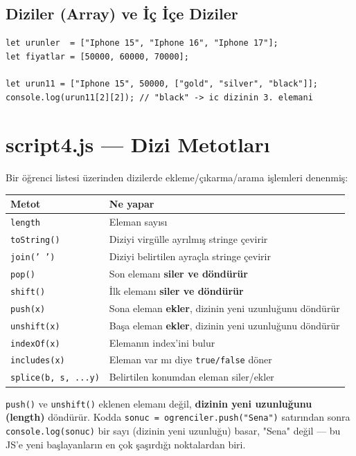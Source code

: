 \documentclass[11pt,a4paper]{article}
\begin{document}
\subsection*{Diziler (Array) ve İç İçe Diziler}

\begin{lstlisting}
let urunler  = ["Iphone 15", "Iphone 16", "Iphone 17"];
let fiyatlar = [50000, 60000, 70000];

let urun11 = ["Iphone 15", 50000, ["gold", "silver", "black"]];
console.log(urun11[2][2]); // "black" -> ic dizinin 3. elemani
\end{lstlisting}

\newpage

\section{script4.js --- Dizi Metotları}

Bir öğrenci listesi üzerinden dizilerde ekleme/çıkarma/arama işlemleri denenmiş:

\begin{center}
\begin{tabular}{@{}p{5.2cm}p{8.3cm}@{}}
\toprule
\textbf{Metot} & \textbf{Ne yapar} \\
\midrule
\texttt{length} & Eleman sayısı \\
\texttt{toString()} & Diziyi virgülle ayrılmış stringe çevirir \\
\texttt{join(' ')} & Diziyi belirtilen ayraçla stringe çevirir \\
\texttt{pop()} & Son elemanı \textbf{siler ve döndürür} \\
\texttt{shift()} & İlk elemanı \textbf{siler ve döndürür} \\
\texttt{push(x)} & Sona eleman \textbf{ekler}, dizinin yeni uzunluğunu döndürür \\
\texttt{unshift(x)} & Başa eleman \textbf{ekler}, dizinin yeni uzunluğunu döndürür \\
\texttt{indexOf(x)} & Elemanın index'ini bulur \\
\texttt{includes(x)} & Eleman var mı diye \texttt{true/false} döner \\
\texttt{splice(b, s, ...y)} & Belirtilen konumdan eleman siler/ekler \\
\bottomrule
\end{tabular}
\end{center}

\begin{dikkat}
\texttt{push()} ve \texttt{unshift()} eklenen elemanı değil, \textbf{dizinin yeni uzunluğunu (length)} döndürür. Kodda \texttt{sonuc = ogrenciler.push("Sena")} satırından sonra \texttt{console.log(sonuc)} bir sayı (dizinin yeni uzunluğu) basar, "Sena" değil --- bu JS'e yeni başlayanların en çok şaşırdığı noktalardan biri.
\end{dikkat}
\end{document}
